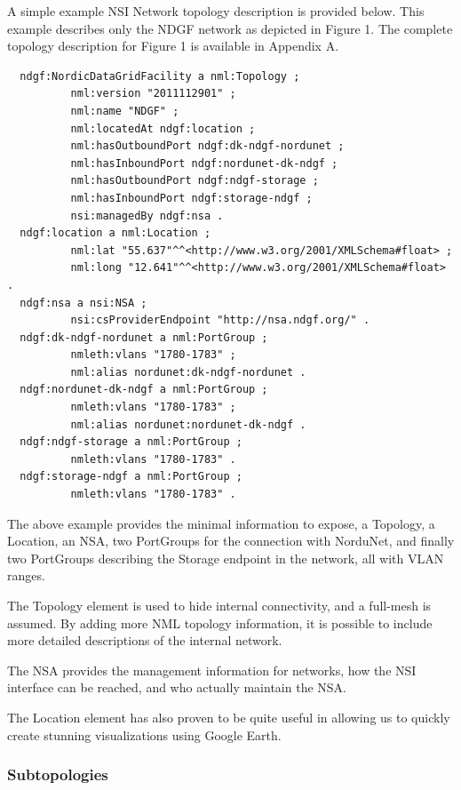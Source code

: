 \documentclass{article}
\begin{document}
 A simple example NSI Network topology description is provided 
below. This example describes only the NDGF network as depicted in Figure 1. The 
complete topology description for Figure 1 is available in Appendix A.

\begin{verbatim}
  ndgf:NordicDataGridFacility a nml:Topology ;
          nml:version "2011112901" ;
          nml:name "NDGF" ;
          nml:locatedAt ndgf:location ;
          nml:hasOutboundPort ndgf:dk-ndgf-nordunet ;
          nml:hasInboundPort ndgf:nordunet-dk-ndgf ;
          nml:hasOutboundPort ndgf:ndgf-storage ;
          nml:hasInboundPort ndgf:storage-ndgf ;
          nsi:managedBy ndgf:nsa .
  ndgf:location a nml:Location ;
          nml:lat "55.637"^^<http://www.w3.org/2001/XMLSchema#float> ;
          nml:long "12.641"^^<http://www.w3.org/2001/XMLSchema#float> .
  ndgf:nsa a nsi:NSA ;
          nsi:csProviderEndpoint "http://nsa.ndgf.org/" .
  ndgf:dk-ndgf-nordunet a nml:PortGroup ;
          nmleth:vlans "1780-1783" ;
          nml:alias nordunet:dk-ndgf-nordunet .
  ndgf:nordunet-dk-ndgf a nml:PortGroup ;
          nmleth:vlans "1780-1783" ;
          nml:alias nordunet:nordunet-dk-ndgf .
  ndgf:ndgf-storage a nml:PortGroup ;
          nmleth:vlans "1780-1783" .
  ndgf:storage-ndgf a nml:PortGroup ;
          nmleth:vlans "1780-1783" .
\end{verbatim}



 The above example provides the minimal information to expose, 
a Topology, a Location, an NSA, two PortGroups for the connection with NorduNet, 
and finally two PortGroups describing the Storage endpoint in the network, all 
with VLAN ranges.

 The Topology element is used to hide internal connectivity, and 
a full-mesh is assumed. By adding more NML topology information, it is possible 
to include more detailed descriptions of the internal network.


 The NSA provides the management information for networks, how 
the NSI interface can be reached, and who actually maintain the NSA.

 The Location element has also proven to be quite useful in allowing 
us to quickly create stunning visualizations using Google Earth.\label{h.xynx25fm6som}


\subsubsection{Subtopologies}
\end{document}
